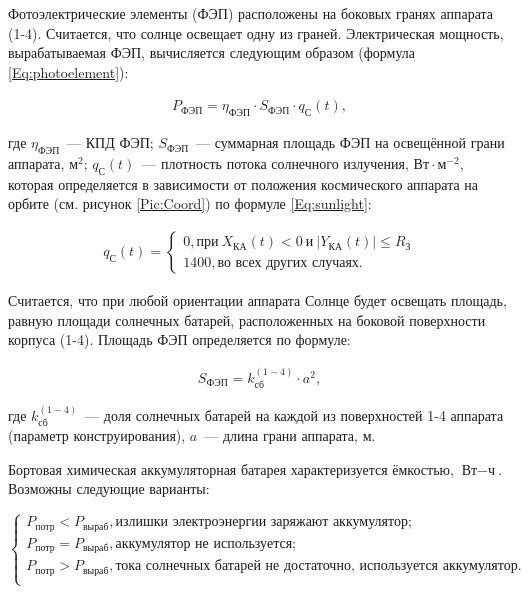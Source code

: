 \documentclass[12pt,a4paper]{article}
\begin{document}
Фотоэлектрические элементы (ФЭП) расположены на боковых гранях аппарата (1-4). Считается,
что солнце освещает одну из граней. Электрическая мощность, вырабатываемая ФЭП,
вычисляется следующим образом (формула \ref{Eq:photoelement}):

\begin{eqnarray}
  P_{\text{ФЭП}} = \eta_{\text{ФЭП}} \cdot S_{\text{ФЭП}} \cdot q_{\text{С}}(t), \label{Eq:photoelement}
\end{eqnarray}

где $\eta_{\text{ФЭП}}$~--- КПД ФЭП; $S_{\text{ФЭП}}$~--- суммарная площадь ФЭП на
освещённой грани аппарата, $\text{м}^2$; $q_{\text{С}}(t)$~--– плотность потока солнечного
излучения, $\text{Вт} \cdot \text{м}^{-2}$, которая определяется в зависимости от положения
космического аппарата на орбите (см. рисунок \ref{Pic:Coord}) по формуле \ref{Eq:sunlight}:

\begin{eqnarray}
  q_{\text{С}}(t) = \left\{
  \begin{array}{l}
    0, \text{при}~X_{\text{КА}}(t) < 0~\text{и}~|Y_{\text{КА}}(t)| \leqslant R_{\text{З}}\\
    1400, \text{во всех других случаях.}
  \end{array}
\right. \label{Eq:sunlight} 
\end{eqnarray}

Считается, что при любой ориентации аппарата Солнце будет освещать площадь, равную площади
солнечных батарей, расположенных на боковой поверхности корпуса (1-4). Площадь ФЭП
определяется по формуле:

\begin{eqnarray}
  S_{\text{ФЭП}} = k^{(1-4)}_{\text{сб}} \cdot a^2, \label{Eq:photopanels}
\end{eqnarray}

где $k^{(1-4)}_{\text{сб}}$~--- доля солнечных батарей на каждой из поверхностей 1-4
аппарата (параметр конструирования), $a$~--– длина грани аппарата, м.

Бортовая химическая аккумуляторная батарея характеризуется ёмкостью, $\text{Вт}-\text{ч}$. Возможны
следующие варианты:

$$
 \left\{
  \begin{array}{l}
    P_{\text{потр}} < P_{\text{выраб}}, \text{излишки электроэнергии заряжают
      аккумулятор};\\
    P_{\text{потр}} = P_{\text{выраб}}, \text{аккумулятор не используется};\\
    P_{\text{потр}} > P_{\text{выраб}}, \text{тока солнечных батарей не достаточно,
      используется аккумулятор}.\\
  \end{array}
\right.
$$
\end{document}
